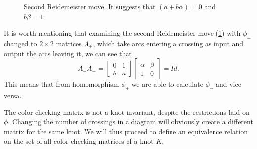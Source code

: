 \begin{figure}[h]\centering
  \caption{Second Reidemeister move. It suggests that $(a+b\alpha)=0$ and $b\beta =1$.\label{fig: ograniczanie phi reidemeister}}
\end{figure}


It is worth mentioning that examining the second Reidemeister move (\cref{fig: ograniczanie phi reidemeister}) with $\phi_\pm$ changed to $2\times 2$ matrices $A_\pm$, which take arcs entering a crossing as input and output the arcs leaving it, we can see that 
$$A_+ A_-=\begin{bmatrix}0 & 1\\ b & a\end{bmatrix}\begin{bmatrix}\alpha & \beta \\ 1 & 0\end{bmatrix}=Id.$$
This means that from homomorphism $\phi_+$ we are able to calculate $\phi_-$ and vice versa.

The color checking matrix is not a knot invariant, despite the restrictions laid on $\phi$. Changing the number of crossings in a diagram will obviously create a different matrix for the same knot. We will thus proceed to define an equivalence relation on the set of all color checking matrices of a knot $K$.











